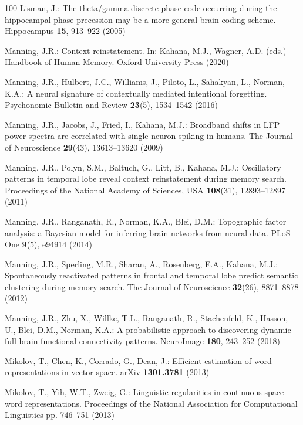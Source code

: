 \documentclass{llmxive}
\begin{document}
\begin{thebibliography}{100}
Lisman, J.: The theta/gamma discrete phase code occurring during the
  hippocampal phase precession may be a more general brain coding scheme.
  Hippocampus  \textbf{15},  913--922 (2005)

Manning, J.R.: Context reinstatement. In: Kahana, M.J., Wagner, A.D. (eds.)
  Handbook of Human Memory. {Oxford} {University} Press (2020)

Manning, J.R., Hulbert, J.C., Williams, J., Piloto, L., Sahakyan, L., Norman,
  K.A.: A neural signature of contextually mediated intentional forgetting.
  Psychonomic Bulletin and Review  \textbf{23}(5),  1534--1542 (2016)

Manning, J.R., Jacobs, J., Fried, I., Kahana, M.J.: Broadband shifts in {LFP}
  power spectra are correlated with single-neuron spiking in humans. The
  Journal of Neuroscience  \textbf{29}(43),  13613--13620 (2009)

Manning, J.R., Polyn, S.M., Baltuch, G., Litt, B., Kahana, M.J.: Oscillatory
  patterns in temporal lobe reveal context reinstatement during memory search.
  Proceedings of the National Academy of Sciences, {USA}  \textbf{108}(31),
  12893--12897 (2011)

Manning, J.R., Ranganath, R., Norman, K.A., Blei, D.M.: Topographic factor
  analysis: a {B}ayesian model for inferring brain networks from neural data.
  {PLoS} One  \textbf{9}(5),  e94914 (2014)

Manning, J.R., Sperling, M.R., Sharan, A., Rosenberg, E.A., Kahana, M.J.:
  Spontaneously reactivated patterns in frontal and temporal lobe predict
  semantic clustering during memory search. The Journal of Neuroscience
  \textbf{32}(26),  8871--8878 (2012)

Manning, J.R., Zhu, X., Willke, T.L., Ranganath, R., Stachenfeld, K., Hasson,
  U., Blei, D.M., Norman, K.A.: A probabilistic approach to discovering dynamic
  full-brain functional connectivity patterns. {NeuroImage}  \textbf{180},
  243--252 (2018)

Mikolov, T., Chen, K., Corrado, G., Dean, J.: Efficient estimation of word
  representations in vector space. {arXiv}  \textbf{1301.3781} (2013)

Mikolov, T., Yih, W.T., Zweig, G.: Linguistic regularities in continuous space
  word representations. Proceedings of the National Association for
  Computational Linguistics pp. 746--751 (2013)


\end{thebibliography}
\end{document}
